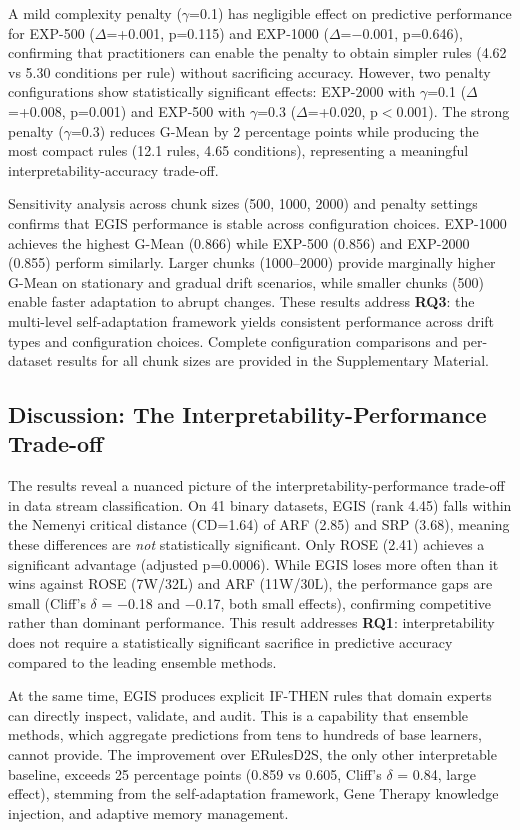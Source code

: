 \documentclass[lettersize,journal]{IEEEtran}
\begin{document}
A mild complexity penalty ($\gamma$=0.1) has negligible effect on predictive performance for EXP-500 ($\Delta$=+0.001, p=0.115) and EXP-1000 ($\Delta$=$-$0.001, p=0.646), confirming that practitioners can enable the penalty to obtain simpler rules (4.62 vs 5.30 conditions per rule) without sacrificing accuracy. However, two penalty configurations show statistically significant effects: EXP-2000 with $\gamma$=0.1 ($\Delta$=+0.008, p=0.001) and EXP-500 with $\gamma$=0.3 ($\Delta$=+0.020, p$<$0.001). The strong penalty ($\gamma$=0.3) reduces G-Mean by 2 percentage points while producing the most compact rules (12.1 rules, 4.65 conditions), representing a meaningful interpretability-accuracy trade-off.

Sensitivity analysis across chunk sizes (500, 1000, 2000) and penalty settings confirms that EGIS performance is stable across configuration choices. EXP-1000 achieves the highest G-Mean (0.866) while EXP-500 (0.856) and EXP-2000 (0.855) perform similarly. Larger chunks (1000--2000) provide marginally higher G-Mean on stationary and gradual drift scenarios, while smaller chunks (500) enable faster adaptation to abrupt changes. These results address \textbf{RQ3}: the multi-level self-adaptation framework yields consistent performance across drift types and configuration choices. Complete configuration comparisons and per-dataset results for all chunk sizes are provided in the Supplementary Material.

\subsection{Discussion: The Interpretability-Performance Trade-off}

The results reveal a nuanced picture of the interpretability-performance trade-off in data stream classification. On 41 binary datasets, EGIS (rank 4.45) falls within the Nemenyi critical distance (CD=1.64) of ARF (2.85) and SRP (3.68), meaning these differences are \textit{not} statistically significant. Only ROSE (2.41) achieves a significant advantage (adjusted p=0.0006). While EGIS loses more often than it wins against ROSE (7W/32L) and ARF (11W/30L), the performance gaps are small (Cliff's $\delta$ = $-$0.18 and $-$0.17, both small effects), confirming competitive rather than dominant performance. This result addresses \textbf{RQ1}: interpretability does not require a statistically significant sacrifice in predictive accuracy compared to the leading ensemble methods.

At the same time, EGIS produces explicit IF-THEN rules that domain experts can directly inspect, validate, and audit. This is a capability that ensemble methods, which aggregate predictions from tens to hundreds of base learners, cannot provide. The improvement over ERulesD2S, the only other interpretable baseline, exceeds 25 percentage points (0.859 vs 0.605, Cliff's $\delta$ = 0.84, large effect), stemming from the self-adaptation framework, Gene Therapy knowledge injection, and adaptive memory management.
\end{document}

